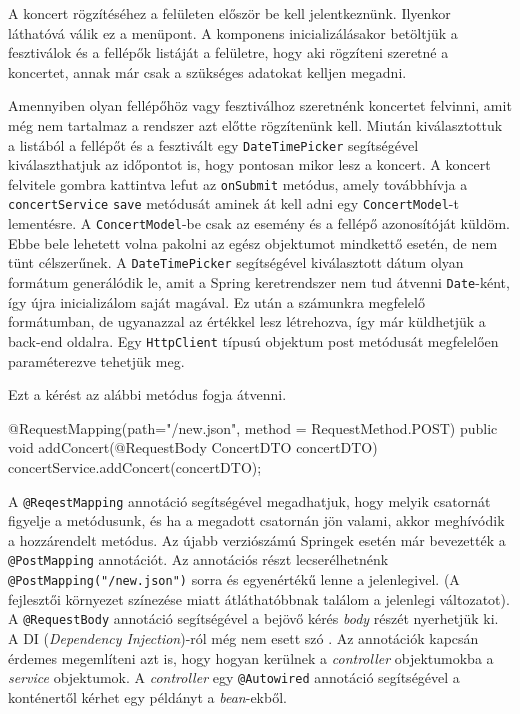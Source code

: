 
A koncert rögzítéséhez a felületen először be kell jelentkeznünk. Ilyenkor láthatóvá válik ez a menüpont. A komponens inicializálásakor betöltjük a fesztiválok és a fellépők listáját a felületre, hogy aki rögzíteni szeretné a koncertet, annak már csak a szükséges adatokat kelljen megadni.

Amennyiben olyan fellépőhöz vagy fesztiválhoz szeretnénk koncertet felvinni, amit még nem tartalmaz a rendszer azt előtte rögzítenünk kell. Miután kiválasztottuk a listából a fellépőt és a fesztivált egy \texttt{DateTimePicker} segítségével kiválaszthatjuk az időpontot is, hogy pontosan mikor lesz a koncert. A koncert felvitele gombra kattintva lefut az \texttt{onSubmit} metódus, amely továbbhívja a \texttt{concertService} \texttt{save} metódusát aminek át kell adni egy \texttt{ConcertModel}-t lementésre. A \texttt{ConcertModel}-be csak az esemény és a fellépő azonosítóját küldöm. Ebbe bele lehetett volna pakolni az egész objektumot mindkettő esetén, de nem tünt célszerűnek. A \texttt{DateTimePicker} segítségével kiválasztott dátum olyan formátum generálódik le, amit a Spring keretrendszer nem tud átvenni \texttt{Date}-ként, így újra inicializálom saját magával. Ez után a számunkra megfelelő formátumban, de ugyanazzal az értékkel lesz létrehozva, így már küldhetjük a back-end oldalra. Egy  \texttt{HttpClient} típusú objektum post metódusát megfelelően paraméterezve tehetjük meg.
Ezt a kérést az alábbi metódus fogja átvenni.
\begin{java}
@RequestMapping(path="/new.json", method = RequestMethod.POST)
public void addConcert(@RequestBody ConcertDTO concertDTO){
	concertService.addConcert(concertDTO);
}
\end{java}

A \texttt{@ReqestMapping} annotáció segítségével megadhatjuk, hogy melyik csatornát figyelje a metódusunk, és ha a megadott csatornán jön valami, akkor meghívódik a hozzárendelt metódus. Az újabb verziószámú Springek esetén már bevezették a \texttt{@PostMapping} annotációt. Az annotációs részt lecserélhetnénk \\
\texttt{@PostMapping("/new.json")} sorra és egyenértékű lenne a jelenlegivel. (A fejlesztői környezet színezése miatt átláthatóbbnak találom a jelenlegi változatot). A \texttt{@RequestBody} annotáció segítségével a bejövő kérés \textit{body} részét nyerhetjük ki. A DI (\textit{Dependency Injection})-ról még nem esett szó \cite{2}. Az annotációk kapcsán érdemes megemlíteni azt is, hogy hogyan kerülnek a \textit{controller} objektumokba a \textit{service} objektumok. A \textit{controller} egy \texttt{@Autowired} annotáció segítségével a konténertől kérhet egy példányt a \textit{bean}-ekből. 

